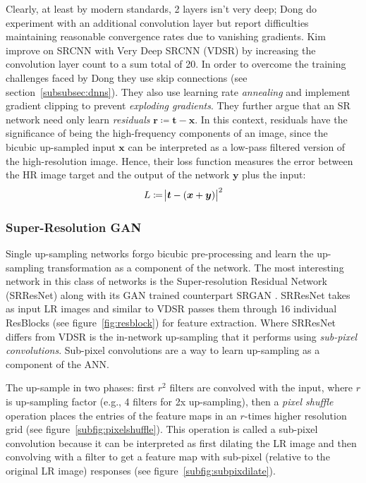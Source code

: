 Clearly, at least by modern standards, 2 layers isn't very deep; Dong \etal do experiment with an additional convolution layer but report difficulties maintaining reasonable convergence rates due to vanishing gradients.
%
Kim \etal \cite{Kim_2016} improve on SRCNN with Very Deep SRCNN (VDSR) by increasing the convolution layer count to a sum total of 20.
%
In order to overcome the training challenges faced by Dong \etal they use skip connections (see section~\ref{subsubsec:dnns}).
%
They also use learning rate \textit{annealing} and implement gradient clipping to prevent \textit{exploding gradients}.
%
They further argue that an SR network need only learn \textit{residuals} \(\bm{r} \coloneqq \bm{t} - \bm{x}\).
%
In this context, residuals have the significance of being the high-frequency components of an image, since the bicubic up-sampled input \(\bm{x}\) can be interpreted as a low-pass filtered version of the high-resolution image.
%
Hence, their loss function measures the error between the HR image target and the output of the network \(\bm{y}\) plus the input:
\begin{equation}
    L \coloneqq \abs{\bm{t} - (\bm{x} + \bm{y})}^2
\end{equation}

\subsubsection{Super-Resolution GAN}\label{subsubsec:srgan}
Single up-sampling networks forgo bicubic pre-processing and learn the up-sampling transformation as a component of the network.
%
The most interesting network in this class of networks is the Super-resolution Residual Network (SRResNet) along with its GAN trained counterpart SRGAN \cite{Ledig_2017}.
%
SRResNet takes as input LR images and similar to VDSR passes them through 16 individual ResBlocks (see figure~\ref{fig:resblock}) for feature extraction.
%
Where SRResNet differs from VDSR is the in-network up-sampling that it performs using \textit{sub-pixel convolutions}.
%
Sub-pixel convolutions are a way to learn up-sampling as a component of the ANN.

%
The up-sample in two phases: first \(r^2\) filters are convolved with the input, where \(r\) is up-sampling factor (e.g., 4 filters for 2x up-sampling), then a \textit{pixel shuffle} operation places the entries of the feature maps in an \(r\)-times higher resolution grid (see figure~\ref{subfig:pixelshuffle}).
%
This operation is called a sub-pixel convolution because it can be interpreted as first dilating the LR image and then convolving with a filter to get a feature map with sub-pixel (relative to the original LR image) responses (see figure~\ref{subfig:subpixdilate}).

